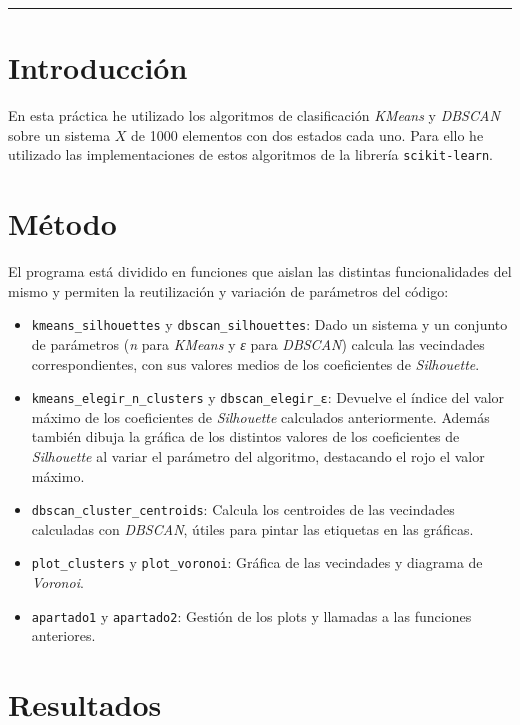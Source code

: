\documentclass[10pt, spanish]{article}
\theoremstyle{definition}
\theoremstyle{break}
\begin{document}
 \noindent\rule{17cm}{1pt}

\section{Introducción}

En esta práctica he utilizado los algoritmos de clasificación \textit{KMeans} y
\textit{DBSCAN} sobre un sistema $X$ de 1000 elementos con dos estados cada uno.
Para ello he utilizado las implementaciones de estos algoritmos de la librería
\texttt{scikit-learn}.

\section{Método}

El programa está dividido en funciones que aislan las distintas funcionalidades
del mismo y permiten la reutilización y variación de parámetros del código:
\begin{itemize}
\setlength\itemsep{0em}
    \item \texttt{kmeans\_silhouettes} y \texttt{dbscan\_silhouettes}: Dado un
        sistema y un conjunto de parámetros (\textit{n} para \textit{KMeans} y
        \textit{ε} para \textit{DBSCAN}) calcula las vecindades
        correspondientes, con sus valores medios de los coeficientes de
        \textit{Silhouette}.
    \item \texttt{kmeans\_elegir\_n\_clusters} y \texttt{dbscan\_elegir\_ε}:
        Devuelve el índice del valor máximo de los coeficientes de \textit{Silhouette}
        calculados anteriormente. Además también dibuja la gráfica de los
        distintos valores de los coeficientes de \textit{Silhouette} al variar el
        parámetro del algoritmo, destacando el rojo el valor máximo.
    \item \texttt{dbscan\_cluster\_centroids}:
        Calcula los centroides de las vecindades calculadas con \textit{DBSCAN},
        útiles para pintar las etiquetas en las gráficas.
    \item \texttt{plot\_clusters} y \texttt{plot\_voronoi}:
        Gráfica de las vecindades y diagrama de \textit{Voronoi}.
    \item \texttt{apartado1} y \texttt{apartado2}:
        Gestión de los plots y llamadas a las funciones anteriores.
\end{itemize}

\section{Resultados}
\end{document}
